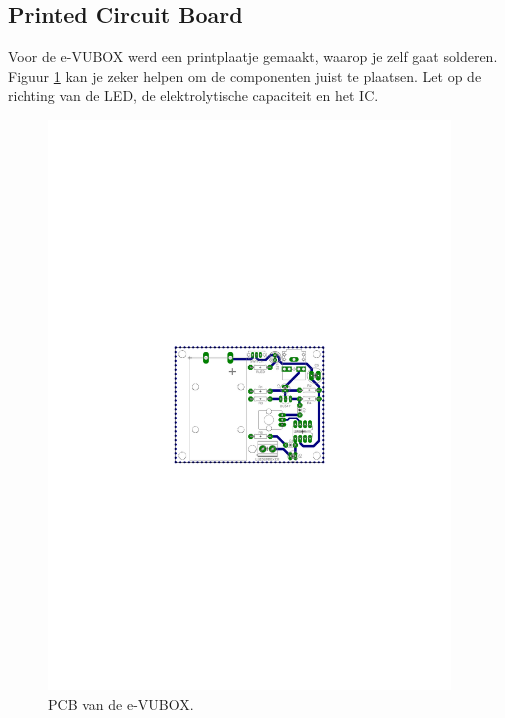 \documentclass{article}
\begin{document}
			\subsection{Printed Circuit Board}
				Voor de e-VUBOX werd een printplaatje gemaakt, waarop je zelf gaat solderen. Figuur \ref{fig:board} kan je zeker helpen om de componenten juist te plaatsen. Let op de richting van de LED, de elektrolytische capaciteit en het IC.
					\begin{figure}[htbp]
					\centering
					\includegraphics[width=0.95\textwidth]{board}
					\caption{PCB van de e-VUBOX.}
					\label{fig:board}
				\end{figure}
\end{document}
